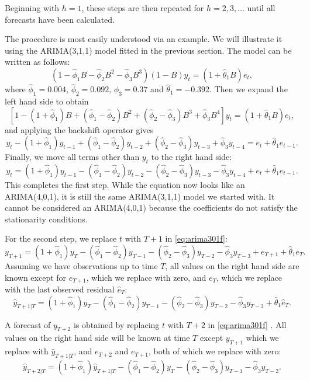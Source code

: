 \documentclass[]{book}
\begin{document}
Beginning with \(h=1\), these steps are then repeated for \(h=2,3,\dots\) until all forecasts have been calculated.

The procedure is most easily understood via an example. We will illustrate it using the ARIMA(3,1,1) model fitted in the previous section. The model can be written as follows:
\[
  (1-\hat{\phi}_1B -\hat{\phi}_2B^2-\hat{\phi}_3B^3)(1-B) y_t = (1+\hat{\theta}_1B)e_{t},
\]
where \(\hat{\phi}_1=0.004\), \(\hat{\phi}_2=0.092\), \(\hat{\phi}_3=0.37\) and \(\hat{\theta}_1=-0.392\). Then we expand the left hand side to obtain
\[
  \left[1-(1+\hat{\phi}_1)B +(\hat{\phi}_1-\hat{\phi}_2)B^2 + (\hat{\phi}_2-\hat{\phi}_3)B^3 +\hat{\phi}_3B^4\right] y_t = (1+\hat{\theta}_1B)e_{t},
\]
and applying the backshift operator gives
\[
  y_t - (1+\hat{\phi}_1)y_{t-1} +(\hat{\phi}_1-\hat{\phi}_2)y_{t-2} + (\hat{\phi}_2-\hat{\phi}_3)y_{t-3} +\hat{\phi}_3y_{t-4} = e_t+\hat{\theta}_1e_{t-1}.
\]
Finally, we move all terms other than \(y_t\) to the right hand side:
\begin{equation}
 \label{eq:arima301f}
  y_t = (1+\hat{\phi}_1)y_{t-1} -(\hat{\phi}_1-\hat{\phi}_2)y_{t-2} - (\hat{\phi}_2-\hat{\phi}_3)y_{t-3} -\hat{\phi}_3y_{t-4} + e_t+\hat{\theta}_1e_{t-1}.
\end{equation}
This completes the first step. While the equation now looks like an ARIMA(4,0,1), it is still the same ARIMA(3,1,1) model we started with. It cannot be considered an ARIMA(4,0,1) because the coefficients do not satisfy the stationarity conditions.

For the second step, we replace \(t\) with \(T+1\) in \eqref{eq:arima301f}:
\[
  y_{T+1} = (1+\hat{\phi}_1)y_{T} -(\hat{\phi}_1-\hat{\phi}_2)y_{T-1} - (\hat{\phi}_2-\hat{\phi}_3)y_{T-2} -\hat{\phi}_3y_{T-3} + e_{T+1}+\hat{\theta}_1e_{T}.
\]
Assuming we have observations up to time \(T\), all values on the right hand side are known except for \(e_{T+1}\), which we replace with zero, and \(e_T\), which we replace with the last observed residual \(\hat{e}_T\):
\[
  \hat{y}_{T+1|T} = (1+\hat{\phi}_1)y_{T} -(\hat{\phi}_1-\hat{\phi}_2)y_{T-1} - (\hat{\phi}_2-\hat{\phi}_3)y_{T-2} -\hat{\phi}_3y_{T-3} + \hat{\theta}_1\hat{e}_{T}.
\]

A forecast of \(y_{T+2}\) is obtained by replacing \(t\) with \(T+2\) in \eqref{eq:arima301f} . All values on the right hand side will be known at time \(T\) except \(y_{T+1}\) which we replace with \(\hat{y}_{T+1|T}\), and \(e_{T+2}\) and \(e_{T+1}\), both of which we replace with zero:
\[
  \hat{y}_{T+2|T} = (1+\hat{\phi}_1)\hat{y}_{T+1|T} -(\hat{\phi}_1-\hat{\phi}_2)y_{T} - (\hat{\phi}_2-\hat{\phi}_3)y_{T-1} -\hat{\phi}_3y_{T-2}.
\]
\end{document}
